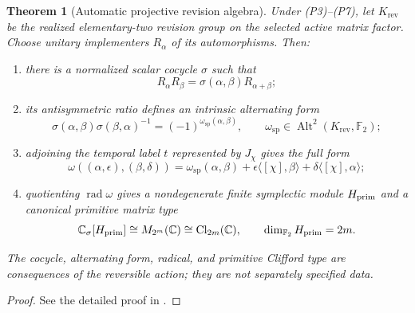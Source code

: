 \documentclass[11pt]{article}
\newtheorem{theorem}{Theorem}[section]
\theoremstyle{definition}
\theoremstyle{remark}
\newcommand{\C}{\mathbb C}
\newcommand{\F}{\mathbb F}
\newcommand{\rad}{\operatorname{rad}}
\newcommand{\Cl}{\mathrm{Cl}}
\newcommand{\spat}{\mathrm{sp}}
\newcommand{\rev}{\mathrm{rev}}
\newcommand{\Alt}{\operatorname{Alt}}
\begin{document}
\begin{theorem}[Automatic projective revision algebra]
\label{thm:projective-revision}
Under \textup{(P3)--(P7)}, let $K_{\rev}$ be the realized
elementary-two revision group on the selected active matrix factor.  Choose
unitary implementers $R_\alpha$ of its automorphisms.  Then:
\begin{enumerate}[label=\textup{(\roman*)},leftmargin=2.7em]
\item there is a normalized scalar cocycle $\sigma$ such that
      \[
        R_\alpha R_\beta
        =\sigma(\alpha,\beta)R_{\alpha+\beta};
      \]
\item its antisymmetric ratio defines an intrinsic alternating form
      \[
        \sigma(\alpha,\beta)\sigma(\beta,\alpha)^{-1}
        =(-1)^{\omega_{\spat}(\alpha,\beta)},
        \qquad
        \omega_{\spat}\in\Alt^2(K_{\rev},\F_2);
      \]
\item adjoining the temporal label $t$ represented by $J_\chi$ gives the full
      form
      \[
      \omega((\alpha,\epsilon),(\beta,\delta))
      =\omega_{\spat}(\alpha,\beta)
       +\epsilon\langle[\chi],\beta\rangle
       +\delta\langle[\chi],\alpha\rangle;
      \]
\item quotienting $\rad\omega$ gives a nondegenerate finite symplectic module
      $H_{\rm prim}$ and a canonical primitive matrix type
      \[
        \C_\sigma[H_{\rm prim}]
        \cong M_{2^m}(\C)
        \cong\Cl_{2m}(\C),
        \qquad \dim_{\F_2}H_{\rm prim}=2m.
      \]
\end{enumerate}
The cocycle, alternating form, radical, and primitive Clifford type are
consequences of the reversible action; they are not separately specified data.
\end{theorem}

\begin{proof}
See the detailed proof in .
\end{proof}
\end{document}
